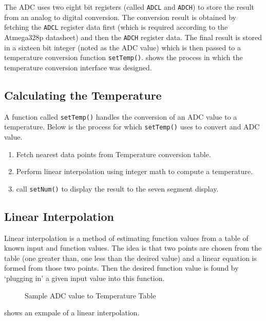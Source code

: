 \documentclass[main.tex]{subfiles}
\begin{document}
		The ADC uses two eight bit registers (called \lstinline{ADCL} and
		\lstinline{ADCH}) to store the result from an analog to digital conversion.
		The conversion result is obtained by fetching the \lstinline{ADCL} register
		data first (which is required according to the Atmega328p datasheet) and
		then the \lstinline{ADCH} register data. The final result is stored in a
		sixteen bit integer (noted as the ADC value) which is then passed to a
		temperature conversion function \lstinline{setTemp()}. 
		shows the process in which the temperature conversion interface was
		designed.

		\subsection{Calculating the Temperature}
		A function called \lstinline{setTemp()} handles the conversion of an ADC
		value to a temperature. Below is the process for which
		\lstinline{setTemp()} uses to convert and ADC value. 
	
		\begin{enumerate}
			\item Fetch nearest data points from Temperature conversion table.
			\item Perform linear interpolation using integer math to compute a
				temperature.
			\item call \lstinline{setNum()} to display the result to the seven segment
				display.
		\end{enumerate}	

		\subsection{Linear Interpolation}
		Linear interpolation is a method of estimating function values from a table
		of known input and function values. The idea is that two points are chosen
		from the table (one greater than, one less than the desired value) and a
		linear equation is formed from those two points. Then the desired function value is
		found by `plugging in' a given input value into this function.

		\begin{figure}[H]
			\begin{center}
				
			\end{center}
			\caption{Sample ADC value to Temperature Table}
			\label{gph:adcTempGraph}
		\end{figure}

		 shows an exmpale of a linear interpolation.
\end{document}

